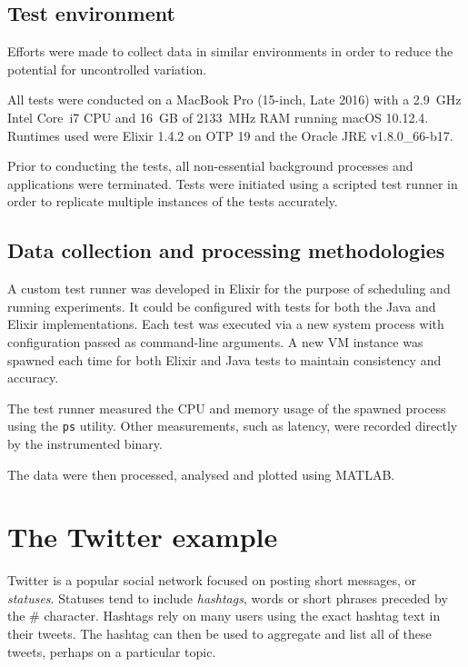 \subsection{Test environment}\label{sec:eval:approach:environment}

Efforts were made to collect data in similar environments in order to reduce the potential for uncontrolled variation.

All tests were conducted on a MacBook Pro (15-inch, Late 2016) with a \SI{2.9}{\giga\hertz} Intel Core~i7 CPU and \SI{16}{GB} of \SI{2133}{\mega\hertz} RAM running macOS 10.12.4.
Runtimes used were Elixir 1.4.2 on OTP 19 and the Oracle JRE v1.8.0\_66-b17.

Prior to conducting the tests, all non-essential background processes and applications were terminated.
Tests were initiated using a scripted test runner in order to replicate multiple instances of the tests accurately.

\subsection{Data collection and processing methodologies}\label{sec:eval:approach:collection}

A custom test runner was developed in Elixir for the purpose of scheduling and running experiments.
It could be configured with tests for both the Java and Elixir implementations.
Each test was executed via a new system process with configuration passed as command-line arguments.
A new VM instance was spawned each time for both Elixir and Java tests to maintain consistency and accuracy.

The test runner measured the CPU and memory usage of the spawned process using the \verb|ps| utility.
Other measurements, such as latency, were recorded directly by the instrumented binary.

The data were then processed, analysed and plotted using MATLAB.

\section{The Twitter example}\label{sec:eval:approach:twitter}

Twitter is a popular social network focused on posting short messages, or \emph{statuses}.
Statuses tend to include \emph{hashtags}, words or short phrases preceded by the \# character.
Hashtags rely on many users using the exact hashtag text in their tweets.
The hashtag can then be used to aggregate and list all of these tweets, perhaps on a particular topic.

